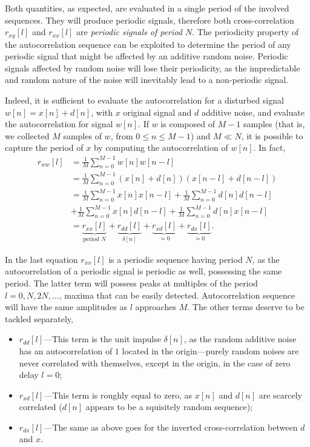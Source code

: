 \documentclass[\documentfontsize, twocolumn]{\classname}
\begin{document}
Both quantities, as expected, are evaluated in a single period of the involved sequences. They will produce periodic signals, therefore both cross-correlation $r_{xy}[l]$ and $r_{xx}[l]$ are \emph{periodic signals of period $N$}. The periodicity property of the autocorrelation sequence can be exploited to determine the period of any periodic signal that might be affected by an additive random noise. Periodic signals affected by random noise will lose their periodicity, as the impredictable and random nature of the noise will inevitably lead to a non-periodic signal. 

Indeed, it is sufficient to evaluate the autocorrelation for a disturbed signal $w[n] = x[n] + d[n]$, with $x$ original signal and $d$ additive noise, and evaluate the autocorrelation for signal $w[n]$. If $w$ is composed of $M-1$ samples (that is, we collected $M$ samples of $w$, from $0 \leq n \leq M-1$) and $M \ll N$, it is possible to capture the period of $x$ by computing the autocorrelation of $w[n]$. In fact,
\begin{align*}
    r_{ww}[l] &= \frac 1 M \sum_{n=0}^{M-1} w[n]w[n-l]\\
              &= \frac 1 M \sum_{n=0}^{M-1} (x[n] + d[n])(x[n-l] + d[n-l])\\
              &= \frac 1 M \sum_{n=0}^{M-1} x[n] x[n-l] + \frac 1 M \sum_{n=0}^{M-1} d[n]d[n-l] \\ &+ \frac 1 M \sum_{n=0}^{M-1} x[n]d[n-l] + \frac 1 M \sum_{n=0}^{M-1} d[n]x[n-l]\\
              &= \underbrace{r_{xx}[l]}_{\mbox{period } N} + \underbrace{r_{dd}[l]}_{\delta[n]} + \underbrace{r_{xd}[l]}_{\simeq 0} + \underbrace{r_{dx}[l]}_{\simeq 0}.
\end{align*}

In the last equation $r_{xx}[l]$ is a periodic sequence having period $N$, as the autocorrelation of a periodic signal is periodic as well, possessing the same period. The latter term will possess peaks at multiples of the period $l=0, N, 2N,\dots$, maxima that can be easily detected. Autocorrelation sequence will have the same amplitudes as $l$ approaches $M$. The other terms deserve to be tackled separately,
\begin{itemize}
    \item $r_{dd}[l]$---This term is the unit impulse $\delta[n]$, as the random additive noise has an autocorrelation of $1$ located in the origin---purely random noises are never correlated with themselves, except in the origin, in the case of zero delay $l=0$;
    \item $r_{xd}[l]$---This term is roughly equal to zero, as $x[n]$ and $d[n]$ are scarcely correlated ($d[n]$ appears to be a squi\-si\-te\-ly random sequence);
    \item $r_{dx}[l]$---The same as above goes for the inverted cross-correlation between $d$ and $x$.
\end{itemize}
\end{document}
